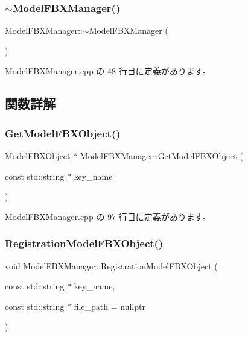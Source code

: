\subsubsection{\texorpdfstring{$\sim$\+Model\+F\+B\+X\+Manager()}{~ModelFBXManager()}}
{\footnotesize\ttfamily Model\+F\+B\+X\+Manager\+::$\sim$\+Model\+F\+B\+X\+Manager (\begin{DoxyParamCaption}{ }\end{DoxyParamCaption})\hspace{0.3cm}{\ttfamily [virtual]}}



 Model\+F\+B\+X\+Manager.\+cpp の 48 行目に定義があります。



\subsection{関数詳解}
\mbox{\label{class_model_f_b_x_manager_abff9802a7edef85fd3b5de53d1d0b177}} 
\subsubsection{\texorpdfstring{Get\+Model\+F\+B\+X\+Object()}{GetModelFBXObject()}}
{\footnotesize\ttfamily \mbox{\hyperlink{class_model_f_b_x_object}{Model\+F\+B\+X\+Object}} $\ast$ Model\+F\+B\+X\+Manager\+::\+Get\+Model\+F\+B\+X\+Object (\begin{DoxyParamCaption}\item[{const std\+::string $\ast$}]{key\+\_\+name }\end{DoxyParamCaption})}



 Model\+F\+B\+X\+Manager.\+cpp の 97 行目に定義があります。

\mbox{\label{class_model_f_b_x_manager_a9a010cad6b7ddf07169daec28807b143}} 
\subsubsection{\texorpdfstring{Registration\+Model\+F\+B\+X\+Object()}{RegistrationModelFBXObject()}}
{\footnotesize\ttfamily void Model\+F\+B\+X\+Manager\+::\+Registration\+Model\+F\+B\+X\+Object (\begin{DoxyParamCaption}\item[{const std\+::string $\ast$}]{key\+\_\+name,  }\item[{const std\+::string $\ast$}]{file\+\_\+path = {\ttfamily nullptr} }\end{DoxyParamCaption})}



